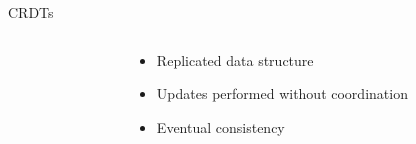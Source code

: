 \documentclass[10pt]{beamer}
\begin{document}
\begin{frame}{\acfp{CRDT}}
\begin{columns}
\begin{column}{0.65\textwidth}
    \end{column}
    \begin{column}{0.35\textwidth}
      \begin{itemize}
        \item Replicated data structure
        \item<2-> Updates performed without coordination
        \item<5-> Eventual consistency
      \end{itemize}
    \end{column}
  \end{columns}
\end{frame}
\end{document}
